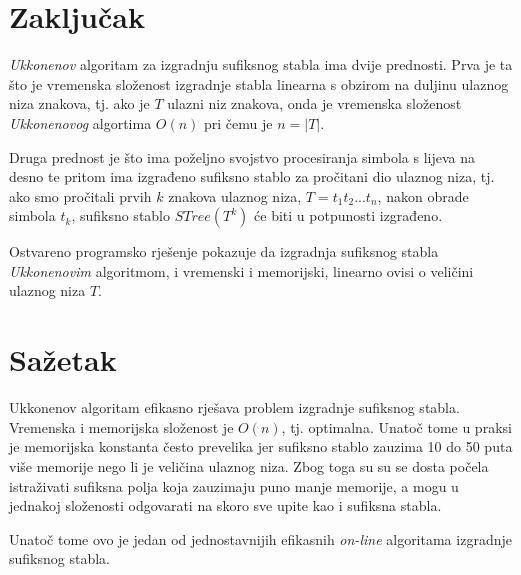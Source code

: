 \documentclass[times, utf8, seminar, numeric]{fer}
\begin{document}
\chapter{Zaključak}
	\textit{Ukkonenov} algoritam za izgradnju sufiksnog stabla ima dvije prednosti. Prva je ta što je vremenska složenost izgradnje stabla linearna s obzirom na duljinu ulaznog niza znakova, tj. ako je $T$ ulazni niz znakova, onda je vremenska složenost \textit{Ukkonenovog} algortima $O(n)$ pri čemu je $n = |T|$.
	
	Druga prednost je što ima poželjno svojstvo procesiranja simbola s lijeva na desno te pritom ima izgrađeno sufiksno stablo za pročitani dio ulaznog niza, tj. ako smo pročitali prvih $k$ znakova ulaznog niza, $T = t_1 t_2 ... t_n$, nakon obrade simbola $t_k$, sufiksno stablo $STree(T^k)$ će biti u potpunosti izgrađeno.

 	Ostvareno programsko rješenje pokazuje da izgradnja sufiksnog stabla \textit{Ukkonenovim} algoritmom, i vremenski i memorijski, linearno ovisi o veličini ulaznog niza $T$.




\chapter{Sažetak}
Ukkonenov algoritam efikasno rješava problem izgradnje sufiksnog stabla. Vremenska i memorijska složenost je $O(n)$, tj. optimalna. Unatoč tome u praksi je memorijska konstanta često prevelika jer sufiksno stablo zauzima 10 do 50 puta više memorije nego li je veličina ulaznog niza. Zbog toga su su se dosta počela istraživati sufiksna polja koja zauzimaju puno manje memorije, a mogu u jednakoj složenosti odgovarati na skoro sve upite kao i sufiksna stabla.

Unatoč tome ovo je jedan od jednostavnijih efikasnih \textit{on-line} algoritama izgradnje sufiksnog stabla.
\end{document}
